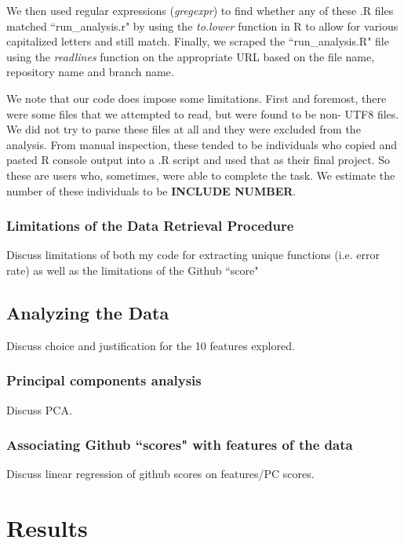 \documentclass[12pt]{article}\usepackage[]{graphicx}\usepackage[]{color}
\begin{document}
We then used regular expressions ({\it gregexpr}) to find whether 
any of these .R files matched ``run\_analysis.r" by using the {\it to.lower}
function in R to allow for various capitalized letters and 
still match. Finally, we scraped the ``run\_analysis.R" file using the {\it readlines} 
function on the appropriate URL based on the file name, repository name 
and branch name.

We note that our code does impose some limitations. First and foremost, there were some files that we attempted to read, but 
were found to be non- UTF8 files. We did not try to parse these files at all and they were excluded from the analysis. 
From manual inspection, these tended to be individuals who copied and pasted R console output into a .R script and used that as 
their final project. So these are users who, sometimes, were able to complete the task. 
We estimate the number of these individuals to be \textbf{INCLUDE NUMBER}.


\subsubsection{Limitations of the Data Retrieval Procedure}

Discuss limitations of both my code for extracting unique functions (i.e. error rate) as well as the limitations of the Github ``score"

\subsection{Analyzing the Data}

Discuss choice and justification for the 10 features explored.

\subsubsection{Principal components analysis}

Discuss PCA.

\subsubsection{Associating Github ``scores" with features of the data}

Discuss linear regression of github scores on features/PC scores.



\section{Results}
\label{results}
\end{document}
